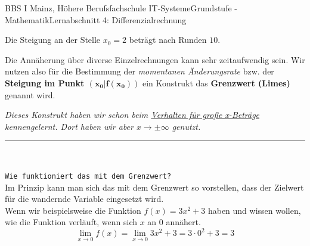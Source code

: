 \documentclass[11pt,twocolumn,oneside,openany,headings=optiontotoc,11pt,numbers=noenddot,final]{article}
\begin{document}
\begin{worksheet}{BBS I Mainz, Höhere Berufsfachschule IT-Systeme}{Grundstufe - Mathematik}{Lernabschnitt 4: Differenzialrechnung}
		\renewcommand{\arraystretch}{1}\\
		\par\noindent
		Die Steigung an der Stelle \(x_0=2\) beträgt nach Runden \(10\).
		\par\noindent
		\par\noindent
		Die Annäherung über diverse Einzelrechnungen kann sehr zeitaufwendig sein. Wir nutzen also für die Bestimmung der \textit{momentanen Änderungsrate}  bzw. der \textbf{Steigung im Punkt \(\mathbf{(x_0|f(x_0))}\)} ein Konstrukt das \textbf{Grenzwert (Limes)} genannt wird.
		\par\noindent
		\setlength{\leftskip}{0.5cm}
		\textit{Dieses Konstrukt haben wir schon beim \underline{Verhalten für große x-Beträge} kennengelernt. Dort haben wir aber \(x \rightarrow \pm\infty\) genutzt.}
		\par\noindent
		\setlength{\leftskip}{0cm}
		\rule{0.48\textwidth}{0.1pt}\\
		\par\noindent
		\texttt{Wie funktioniert das mit dem Grenzwert?}\\
		Im Prinzip kann man sich das mit dem Grenzwert so vorstellen, dass der \grq{}Zielwert\grq{} für die \grq{}wandernde\grq{} Variable eingesetzt wird.\\
		Wenn wir beispielsweise die Funktion \(f(x) = 3x^2 + 3\) haben und wissen wollen, wie die Funktion verläuft, wenn sich \(x\) an \(0\) annähert.
		\[\lim\limits_{x\rightarrow{}0} f(x) = \lim\limits_{x\rightarrow{}0} 3x^2 + 3 = 3\cdot{}0^2 + 3 = 3 \]
		\\

\end{worksheet}
\end{document}

